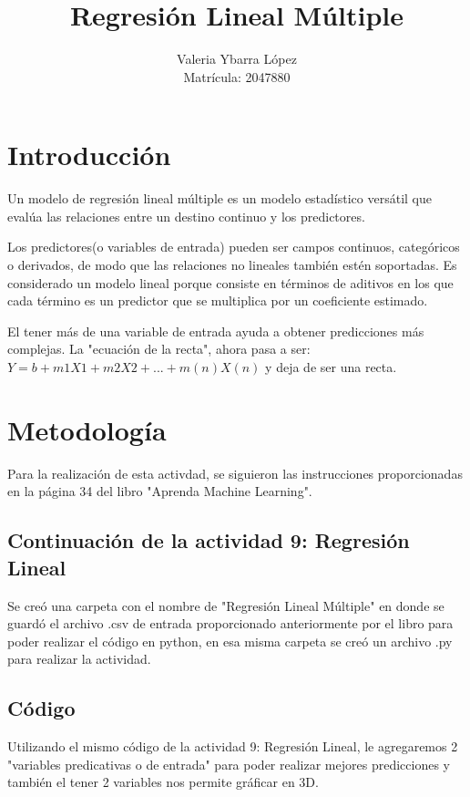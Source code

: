 \documentclass{pssbmac}
\begin{document}
\title{Regresión Lineal Múltiple}

\author{
    {\large Valeria Ybarra López}\\
    {\small Matrícula: 2047880} \\
}
\criartitulo


\noindent


\section{Introducción}
Un modelo de regresión lineal múltiple es un modelo estadístico versátil que evalúa las relaciones entre un destino continuo y los predictores.

Los predictores(o variables de entrada) pueden ser campos continuos, categóricos o derivados, de modo que las relaciones no lineales también estén soportadas. Es considerado un modelo lineal porque consiste en términos de aditivos en los que cada término es un predictor que se multiplica por un coeficiente estimado.

El tener más de una variable de entrada ayuda a obtener predicciones más complejas. La "ecuación de la recta", ahora pasa a ser: \(Y=b+m1X1+m2X2+...+m(n)X(n)\)
y deja de ser una recta.
 

\section{Metodología}

Para la realización de esta activdad, se siguieron las instrucciones proporcionadas en la página 34 del libro "Aprenda Machine Learning".
\subsection{Continuación de la actividad 9: Regresión Lineal}

Se creó una carpeta con el nombre de "Regresión Lineal Múltiple" en donde se guardó el archivo .csv de entrada proporcionado anteriormente  por el libro para poder realizar el código en python, en esa misma carpeta se creó un archivo .py para realizar la actividad.

\subsection{Código}
Utilizando el mismo código de la actividad 9: Regresión Lineal, le agregaremos 2 "variables predicativas o de entrada" para poder realizar mejores predicciones y también el tener 2 variables nos permite gráficar en 3D.
\end{document}
